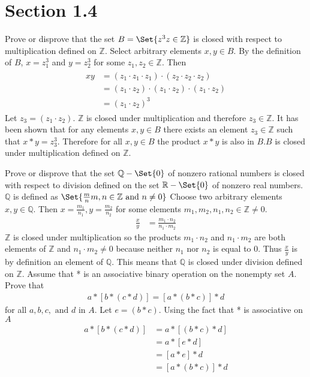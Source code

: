 \documentclass[paper=a4, fontsize=11pt]{jhwhw} %
\providecommand\given{} %
\begin{document}
\section*{Section 1.4}
Prove or disprove that the set $B = \Set{z^3 \given z \in \mathbb{Z}}$ is closed with respect to multiplication defined on $\mathbb{Z}$.
\solution
Select arbitrary elements $x, y \in B$. By the definition of $B$, $x=z_1^3$ and $y=z_2^3$ for some $z_1, z_2 \in \mathbb{Z}$. Then
\begin{align}
\begin{split}
xy &= (z_1 \cdot z_1 \cdot z_1)\cdot (z_2\cdot z_2\cdot z_2)\\
&= (z_1\cdot z_2)\cdot (z_1\cdot z_2)\cdot (z_1\cdot z_2)\\
&= (z_1\cdot z_2)^3
\end{split}
\end{align}
Let $z_3 = (z_1\cdot z_2)$. $\mathbb{Z}$ is closed under multiplication and therefore $z_3 \in \mathbb{Z}$. It has been shown that for any elements $x, y\in B$ there exists an element $z_3\in \mathbb{Z}$ such that $x*y = z_3^3$. Therefore for all $x,y\in B$ the product $x*y$ is also in $B$.$B$ is closed under multiplication defined on $\mathbb{Z}$.

Prove or disprove that the set $\mathbb{Q} - \Set{0}$ of nonzero rational numbers is closed with respect to division defined on the set $\mathbb{R} - \Set{0}$ of nonzero real numbers.
\solution
$\mathbb{Q}$ is defined as $\Set{\frac{m}{n} \given m,n\in \mathbb{Z}\text{ and } n\not=0}$
Choose two arbitrary elements $x,y \in \mathbb{Q}$. Then $x = \frac{m_1}{n_1}, y = \frac{m_2}{n_2}$ for some elements $m_1, m_2, n_1, n_2 \in \mathbb{Z} \not= 0$.
\begin{align}
\frac{x}{y} &=  \frac{m_1\cdot n_2}{n_1\cdot m_2}
\end{align}
$\mathbb{Z}$ is closed under multiplication so the products $m_1\cdot n_2$ and $n_1\cdot m_2$ are both elements of $\mathbb{Z}$ and $n_1\cdot m_2 \not= 0$ because neither $n_1$ nor $n_2$ is equal to 0. Thus $\frac{x}{y}$ is by definition an element of $\mathbb{Q}$. This means that $\mathbb{Q}$ is closed under division defined on $\mathbb{Z}$.
Assume that * is an associative binary operation on the nonempty set $A$. Prove that
\begin{align}
a * [b * (c * d)] = [a * (b * c)] * d
\end{align}
for all $a,b,c,\text{ and }d$ in $A$.
\solution
Let $e=(b*c)$. Using the fact that * is associative on $A$
\begin{align}
\begin{split}
a * [b * (c * d)] &= a * [(b * c) * d]\\
&= a * [e * d]\\
&=[a * e] * d\\
&=[a * (b * c)] * d
\end{split}
\end{align}
\end{document}
